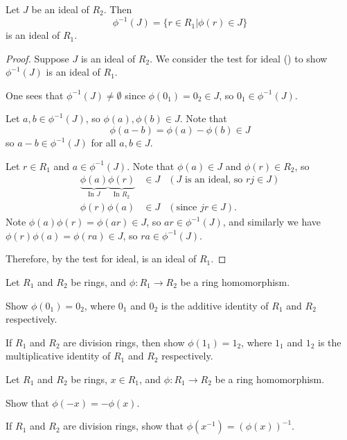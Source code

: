 \begin{proposition}\label{prop-inverse-homomorphism-on-ideal-is-ideal}
    Let $J$ be an ideal of $R_2$. Then
    \[
        \phi^{-1}(J) = \{r \in R_1 \vert \phi(r) \in J\}
    \]
    is an ideal of $R_1$.
\end{proposition}
\begin{proof}
    Suppose $J$ is an ideal of $R_2$. We consider the test for ideal () to show $\phi^{-1}(J)$ is an ideal of $R_1$.
    
    One sees that $\phi^{-1}(J) \neq \emptyset$ since $\phi(0_1) = 0_2 \in J$, so $0_1 \in \phi^{-1}(J)$.

    Let $a, b \in \phi^{-1}(J)$, so $\phi(a), \phi(b) \in J$. Note that
    \[
        \phi(a-b) = \phi(a) - \phi(b) \in J
    \]
    so $a-b \in \phi^{-1}(J)$ for all $a,b \in J$.

    Let $r \in R_1$ and $a \in \phi^{-1}(J)$. Note that $\phi(a) \in J$ and $\phi(r) \in R_2$, so
    \begin{align*}
        \underbrace{\phi(a)}_{\text{In }J}\underbrace{\phi(r)}_{\text{In }R_2} &\in J & (J\text{ is an ideal, so } rj \in J)\\
        \phi(r)\phi(a) &\in J & (\text{since } jr \in J).
    \end{align*}
    Note $\phi(a)\phi(r) = \phi(ar) \in J$, so $ar \in \phi^{-1}(J)$, and similarly we have $\phi(r)\phi(a) = \phi(ra) \in J$, so $ra \in \phi^{-1}(J)$.

    Therefore, by the test for ideal, is an ideal of $R_1$.
\end{proof}

\begin{exercise}\label{exercise-ring-image-of-identity-is-identity}
    Let $R_1$ and $R_2$ be rings, and $\phi: R_1 \to R_2$ be a ring homomorphism.
    \begin{partquestions}{\alph*}
        \item Show $\phi(0_1) = 0_2$, where $0_1$ and $0_2$ is the additive identity of $R_1$ and $R_2$ respectively.
        \item If $R_1$ and $R_2$ are division rings, then show $\phi(1_1) = 1_2$, where $1_1$ and $1_2$ is the multiplicative identity of $R_1$ and $R_2$ respectively.
    \end{partquestions}
\end{exercise}

\begin{exercise}\label{exercise-ring-image-of-inverse-is-inverse}
    Let $R_1$ and $R_2$ be rings, $x \in R_1$, and $\phi: R_1 \to R_2$ be a ring homomorphism.
    \begin{partquestions}{\alph*}
        \item Show that $\phi(-x) = -\phi(x)$.
        \item If $R_1$ and $R_2$ are division rings, show that $\phi(x^{-1}) = (\phi(x))^{-1}$.
    \end{partquestions}
\end{exercise}

